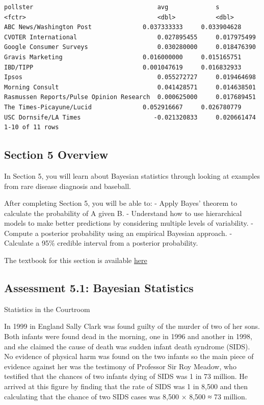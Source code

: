 \documentclass[
]{article}
\begin{document}
\begin{verbatim}
pollster                                  avg             s
<fctr>                                    <dbl>           <dbl>
ABC News/Washington Post              0.037333333     0.033904628
CVOTER International                      0.027895455     0.017975499
Google Consumer Surveys                   0.030280000     0.018476390
Gravis Marketing                      0.016000000     0.015165751
IBD/TIPP                              0.001047619     0.016832933
Ipsos                                     0.055272727     0.019464698
Morning Consult                           0.041428571     0.014638501
Rasmussen Reports/Pulse Opinion Research  0.000625000     0.017689451
The Times-Picayune/Lucid              0.052916667     0.026780779
USC Dornsife/LA Times                    -0.021320833     0.020661474
1-10 of 11 rows
\end{verbatim}

\hypertarget{section-5-overview}{%
\subsection{Section 5 Overview}\label{section-5-overview}}

In Section 5, you will learn about Bayesian statistics through looking
at examples from rare disease diagnosis and baseball.

After completing Section 5, you will be able to: - Apply Bayes' theorem
to calculate the probability of A given B. - Understand how to use
hierarchical models to make better predictions by considering multiple
levels of variability. - Compute a posterior probability using an
empirical Bayesian approach. - Calculate a 95\% credible interval from a
posterior probability.

The textbook for this section is available
\href{https://rafalab.github.io/dsbook/models.html\#bayesian-statistics}{here}

\hypertarget{assessment-5.1-bayesian-statistics}{%
\subsection{Assessment 5.1: Bayesian
Statistics}\label{assessment-5.1-bayesian-statistics}}

Statistics in the Courtroom

In 1999 in England Sally Clark was found guilty of the murder of two of
her sons. Both infants were found dead in the morning, one in 1996 and
another in 1998, and she claimed the cause of death was sudden infant
death syndrome (SIDS). No evidence of physical harm was found on the two
infants so the main piece of evidence against her was the testimony of
Professor Sir Roy Meadow, who testified that the chances of two infants
dying of SIDS was 1 in 73 million. He arrived at this figure by finding
that the rate of SIDS was 1 in 8,500 and then calculating that the
chance of two SIDS cases was 8,500 × 8,500 ≈ 73 million.
\end{document}
